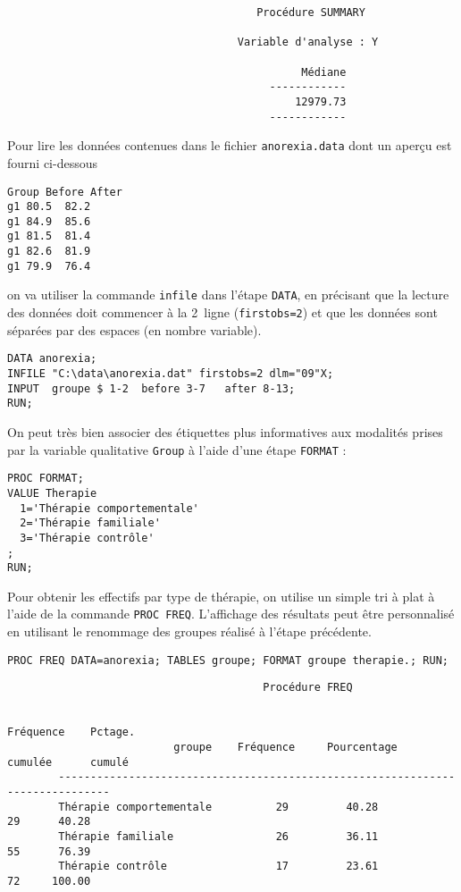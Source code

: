 \begin{verbatim}
                                       Procédure SUMMARY

                                    Variable d'analyse : Y

                                              Médiane
                                         ------------
                                             12979.73
                                         ------------
\end{verbatim}
%
%
%
\soln{\ref{exo:8.3}}
Pour lire les données contenues dans le fichier \texttt{anorexia.data} dont
un aperçu est fourni ci-dessous
\begin{verbatim}
Group Before After
g1 80.5  82.2
g1 84.9  85.6
g1 81.5  81.4
g1 82.6  81.9
g1 79.9  76.4
\end{verbatim}
on va utiliser la commande \texttt{infile} dans l'étape \texttt{DATA}, en
précisant que la lecture des données doit commencer à la 2\ieme\ ligne
(\texttt{firstobs=2}) et que les données sont séparées par des espaces (en
nombre variable).
\begin{verbatim}
DATA anorexia;
INFILE "C:\data\anorexia.dat" firstobs=2 dlm="09"X;
INPUT  groupe $ 1-2  before 3-7   after 8-13;
RUN;
\end{verbatim}
On peut très bien associer des étiquettes plus informatives aux modalités
prises par la variable qualitative \texttt{Group} à l'aide d'une étape
\texttt{FORMAT} :
\begin{verbatim}
PROC FORMAT;
VALUE Therapie
  1='Thérapie comportementale'
  2='Thérapie familiale'
  3='Thérapie contrôle'
;
RUN;
\end{verbatim}

Pour obtenir les effectifs par type de thérapie, on utilise un simple tri à
plat à l'aide de la commande \texttt{PROC FREQ}. L'affichage des résultats
peut être personnalisé en utilisant le renommage des groupes réalisé à
l'étape précédente.
\begin{verbatim}
PROC FREQ DATA=anorexia; TABLES groupe; FORMAT groupe therapie.; RUN;
\end{verbatim}

\begin{verbatim}
                                        Procédure FREQ

                                                                  Fréquence    Pctage.
                          groupe    Fréquence     Pourcentage     cumulée      cumulé
        ------------------------------------------------------------------------------
        Thérapie comportementale          29         40.28              29      40.28
        Thérapie familiale                26         36.11              55      76.39
        Thérapie contrôle                 17         23.61              72     100.00
\end{verbatim}

